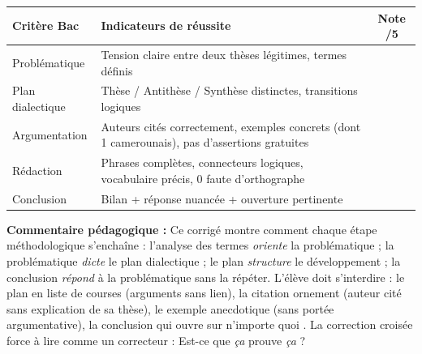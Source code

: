 \documentclass[11pt]{article}
\begin{document}
\begin{exoresolu}
\begin{center}
\begin{tabularx}{\linewidth}{|l|X|c|}
\hline
\rowcolor{popblueL}
\textbf{Critère Bac} & \textbf{Indicateurs de réussite} & \textbf{Note /5} \\
\hline
Problématique & Tension claire entre deux thèses légitimes, termes définis & \\
Plan dialectique & Thèse / Antithèse / Synthèse distinctes, transitions logiques & \\
Argumentation & Auteurs cités correctement, exemples concrets (dont 1 camerounais), pas d'assertions gratuites & \\
Rédaction & Phrases complètes, connecteurs logiques, vocabulaire précis, 0 faute d'orthographe & \\
Conclusion & Bilan + réponse nuancée + ouverture pertinente & \\
\hline
\end{tabularx}
\end{center}
\tcblower
\textbf{Commentaire pédagogique :} Ce corrigé montre comment chaque étape méthodologique s'enchaîne : l'analyse des termes \emph{oriente} la problématique ; la problématique \emph{dicte} le plan dialectique ; le plan \emph{structure} le développement ; la conclusion \emph{répond} à la problématique sans la répéter. L'élève doit s'interdire : le \guillemotleft plan en liste de courses \guillemotright (arguments sans lien), la \guillemotleft citation ornement \guillemotright (auteur cité sans explication de sa thèse), le \guillemotleft exemple anecdotique \guillemotright (sans portée argumentative), la \guillemotleft conclusion qui ouvre sur n'importe quoi \guillemotright. La correction croisée force à lire comme un correcteur : \guillemotleft Est-ce que \emph{ça} prouve \emph{ça} ? \guillemotright
\end{exoresolu}
\end{document}
